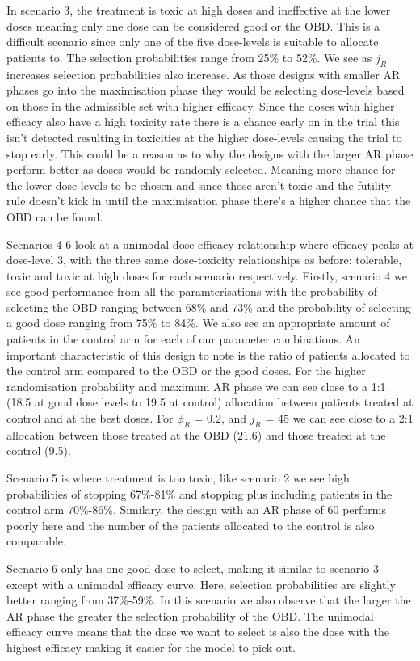 In scenario 3, the treatment is toxic at high doses and ineffective at the lower doses meaning only one dose can be considered good or the OBD. This is a difficult scenario since only one of the five dose-levels is suitable to allocate patients to. The selection probabilities range from 25\% to 52\%. We see as $j_R$ increases selection probabilities also increase. As those designs with smaller AR phases go into the maximisation phase they would be selecting dose-levels based on those in the admissible set with higher efficacy. Since the doses with higher efficacy also have a high toxicity rate there is a chance early on in the trial this isn't detected resulting in toxicities at the higher dose-levels causing the trial to stop early. This could be a reason as to why the designs with the larger AR phase perform better as doses would be randomly selected. Meaning more chance for the lower dose-levels to be chosen and since those aren't toxic and the futility rule doesn't kick in until the maximisation phase there's a higher chance that the OBD can be found.

Scenarios 4-6 look at a unimodal dose-efficacy relationship where efficacy peaks at dose-level 3, with the three same dose-toxicity relationships as before: tolerable, toxic and toxic at high doses for each scenario respectively. Firstly, scenario 4 we see good performance from all the paramterisations with the probability of selecting the OBD ranging between 68\% and 73\% and the probability of selecting a good dose ranging from 75\% to 84\%. We also see an appropriate amount of patients in the control arm for each of our parameter combinations. An important characteristic of this design to note is the ratio of patients allocated to the control arm compared to the OBD or the good doses. For the higher randomisation probability and maximum AR phase we can see close to a  1:1 (18.5 at good dose levels to 19.5 at control) allocation between patients treated at control and at the best doses. For $\phi_R$ = 0.2, and $j_R$ = 45 we can see close to a 2:1 allocation between those treated at the OBD (21.6) and those treated at the control (9.5). 

Scenario 5 is where treatment is too toxic, like scenario 2 we see high probabilities of stopping 67\%-81\% and stopping plus including patients in the control arm 70\%-86\%. Similary, the design with an AR phase of 60 performs poorly here and the number of the patients allocated to the control is also comparable. 

Scenario 6 only has one good dose to select, making it similar to scenario 3 except with a unimodal efficacy curve. Here, selection probabilities are slightly better ranging from 37\%-59\%. In this scenario we also observe that the larger the AR phase the greater the selection probability of the OBD. The unimodal efficacy curve means that the dose we want to select is also the dose with the highest efficacy making it easier for the model to pick out. 

